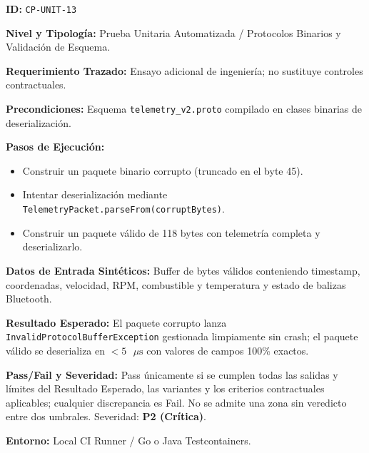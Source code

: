 \par\noindent\textbf{ID:} \texttt{CP-\allowbreak{}UNIT-\allowbreak{}13}\par
\par\noindent\textbf{Nivel y Tipología:} Prueba Unitaria Automatizada / Protocolos Binarios y Validación de Esquema.\par
\par\noindent\textbf{Requerimiento Trazado:} Ensayo adicional de ingeniería; no sustituye controles contractuales.\par
\par\noindent\textbf{Precondiciones:} Esquema \texttt{telemetry\_\allowbreak{}v2.proto} compilado en clases binarias de deserialización.\par
\par\noindent\textbf{Pasos de Ejecución:}\par
\begin{itemize}
\item Construir un paquete binario corrupto (truncado en el byte 45).
\item Intentar deserialización mediante \texttt{Telemetry\allowbreak{}Packet.\allowbreak{}parse\allowbreak{}From(\allowbreak{}corrupt\allowbreak{}Bytes)}.
\item Construir un paquete válido de 118 bytes con telemetría completa y deserializarlo.
\end{itemize}

\par\noindent\textbf{Datos de Entrada Sintéticos:} Buffer de bytes válidos conteniendo timestamp, coordenadas, velocidad, RPM, combustible y temperatura y estado de balizas Bluetooth.\par
\par\noindent\textbf{Resultado Esperado:} El paquete corrupto lanza \texttt{Invalid\allowbreak{}Protocol\allowbreak{}Buffer\allowbreak{}Exception} gestionada limpiamente sin crash; el paquete válido se deserializa en \(< 5\text{ }\mu\text{s}\) con valores de campos 100\% exactos.\par
\par\noindent\textbf{Pass/Fail y Severidad:} Pass únicamente si se cumplen todas las salidas y límites del Resultado Esperado, las variantes y los criterios contractuales aplicables; cualquier discrepancia es Fail. No se admite una zona sin veredicto entre dos umbrales. Severidad: \textbf{P2 (Crítica)}.\par
\par\noindent\textbf{Entorno:} Local CI Runner / Go o Java Testcontainers.\par


